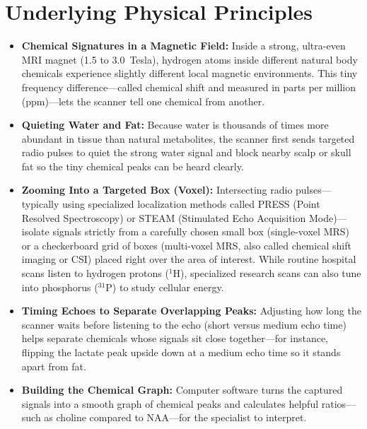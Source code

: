 \section{Underlying Physical Principles}
\begin{itemize}
\item \textbf{Chemical Signatures in a Magnetic Field:} Inside a strong, ultra-even MRI magnet (1.5 to 3.0~Tesla), hydrogen atoms inside different natural body chemicals experience slightly different local magnetic environments. This tiny frequency difference---called chemical shift and measured in parts per million (ppm)---lets the scanner tell one chemical from another.
\item \textbf{Quieting Water and Fat:} Because water is thousands of times more abundant in tissue than natural metabolites, the scanner first sends targeted radio pulses to quiet the strong water signal and block nearby scalp or skull fat so the tiny chemical peaks can be heard clearly.
\item \textbf{Zooming Into a Targeted Box (Voxel):} Intersecting radio pulses---typically using specialized localization methods called PRESS (Point Resolved Spectroscopy) or STEAM (Stimulated Echo Acquisition Mode)---isolate signals strictly from a carefully chosen small box (single-voxel MRS) or a checkerboard grid of boxes (multi-voxel MRS, also called chemical shift imaging or CSI) placed right over the area of interest. While routine hospital scans listen to hydrogen protons ($^1$H), specialized research scans can also tune into phosphorus ($^{31}$P) to study cellular energy.
\item \textbf{Timing Echoes to Separate Overlapping Peaks:} Adjusting how long the scanner waits before listening to the echo (short versus medium echo time) helps separate chemicals whose signals sit close together---for instance, flipping the lactate peak upside down at a medium echo time so it stands apart from fat.
\item \textbf{Building the Chemical Graph:} Computer software turns the captured signals into a smooth graph of chemical peaks and calculates helpful ratios---such as choline compared to NAA---for the specialist to interpret.
\end{itemize}

